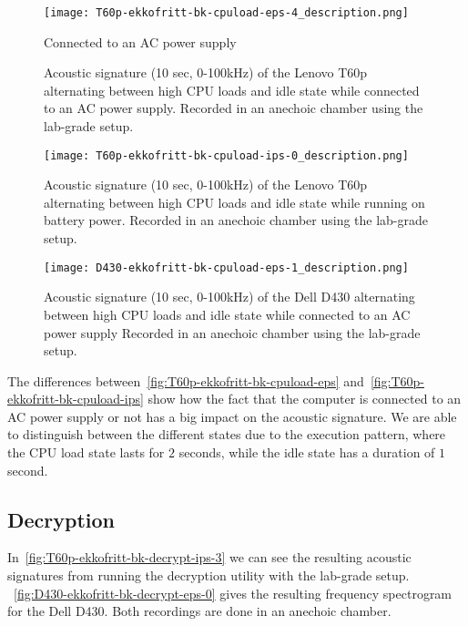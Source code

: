 \begin{figure}[ht]
    \centering
    \texttt{[image: T60p-ekkofritt-bk-cpuload-eps-4\_description.png]}
    \caption{Connected to an AC power supply}
    \caption{Acoustic signature (10 sec, 0-100kHz) of the Lenovo T60p alternating between high CPU loads and idle state while connected to an AC power supply. 
        Recorded in an anechoic chamber using the lab-grade setup.}
    \label{fig:T60p-ekkofritt-bk-cpuload-eps}
\end{figure}


\begin{figure}[ht]
    \centering
    \texttt{[image: T60p-ekkofritt-bk-cpuload-ips-0\_description.png]}
    \caption{Acoustic signature (10 sec, 0-100kHz) of the Lenovo T60p alternating between high CPU loads and idle state while running on battery power. 
        Recorded in an anechoic chamber using the lab-grade setup.}
    \label{fig:T60p-ekkofritt-bk-cpuload-ips}
\end{figure}


\begin{figure}[ht]
    \centering
    \texttt{[image: D430-ekkofritt-bk-cpuload-eps-1\_description.png]}
    \caption{Acoustic signature (10 sec, 0-100kHz) of the Dell D430 alternating between high CPU loads and idle state while connected to an AC power supply
        Recorded in an anechoic chamber using the lab-grade setup.}
    \label{fig:D430-ekkofritt-bk-cpuload-eps-1}
\end{figure}

The differences between~\autoref{fig:T60p-ekkofritt-bk-cpuload-eps} and~\autoref{fig:T60p-ekkofritt-bk-cpuload-ips} show how the fact that the computer is connected to an AC power supply or not has a big impact on the acoustic signature.
We are able to distinguish between the different states due to the execution pattern, where the CPU load state lasts for $2$ seconds, while the idle state has a duration of $1$ second.


\subsection{Decryption}\label{chp5:subsec:t60p_bk_results_decryption}
In~\autoref{fig:T60p-ekkofritt-bk-decrypt-ips-3} we can see the resulting acoustic signatures from running the decryption utility with the lab-grade setup.
~\autoref{fig:D430-ekkofritt-bk-decrypt-eps-0} gives the resulting frequency spectrogram for the Dell D430.
Both recordings are done in an anechoic chamber.

